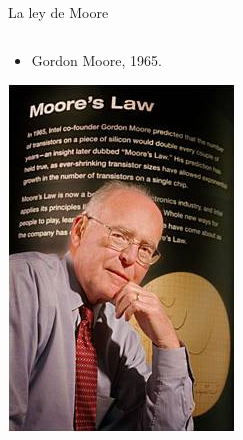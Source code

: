 \begin{frame}[t]{La ley de Moore}
\begin{columns}
\begin{column}{.5\textwidth}
\begin{itemize}
\begin{itemize}
        \item Gordon Moore, 1965.
      \end{itemize}
    \end{itemize}
    \vspace{1em}
    \begin{center}
      \includegraphics[width=.4\textwidth]{images/gordon-moore.jpg}
    \end{center}
  \end{column}
\end{columns}
\end{frame}



